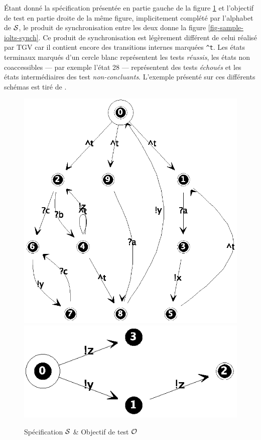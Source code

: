\'Etant donn\'e la sp\'ecification pr\'esent\'ee en partie gauche
de la figure \ref{fig-sample-iolts} et l'objectif de test en partie
droite de la m\^eme figure, implicitement compl\'et\'e par
l'alphabet de ${\cal S}$, le produit de
synchronisation entre les deux donne la figure
\ref{fig-sample-iolts-synch}. Ce produit de synchronisation est
l\'eg\`erement diff\'erent de celui r\'ealis\'e par \textsf{TGV} car il
contient encore des transitions internes marqu\'ees \verb|^t|.
Les \'etats terminaux marqu\'es d'un cercle blanc repr\'esentent
les tests \emph{r\'eussis}, les \'etats non coaccessibles --- par
exemple l'\'etat 28 --- 
repr\'esentent des tests \emph{\'echou\'es} et les \'etats
interm\'ediaires des test \emph{non-concluants}.
L'exemple pr\'esent\'e sur ces diff\'erents sch\'emas est tir\'e
de \cite{tgv}. 

\begin{figure}[htbp]
    \centering
    \includegraphics[width=.45\textwidth]{figures/fig-sample-iolts.eps}
    \includegraphics[width=.45\textwidth]{figures/fig-sample-iolts-tp.eps}
    \caption{Sp\'ecification ${\cal S}$ \& Objectif de test ${\cal O }$}
    \label{fig-sample-iolts}
\end{figure}

